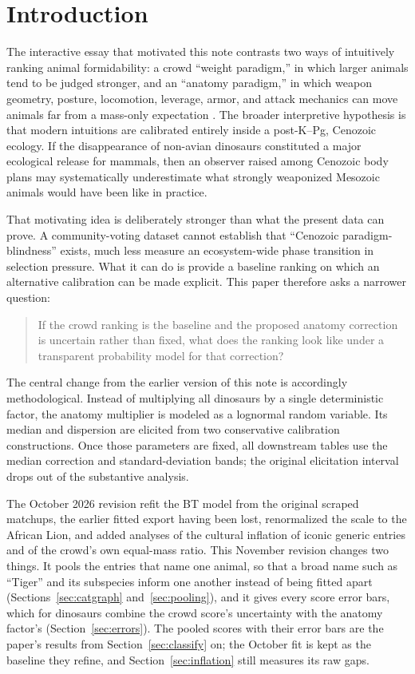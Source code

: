 \documentclass[11pt]{article}
\begin{document}
\tableofcontents
\newpage

\section{Introduction}

The interactive essay that motivated this note contrasts two ways of intuitively ranking animal formidability: a crowd ``weight paradigm,'' in which larger animals tend to be judged stronger, and an ``anatomy paradigm,'' in which weapon geometry, posture, locomotion, leverage, armor, and attack mechanics can move animals far from a mass-only expectation \cite{benanderDino2026}. The broader interpretive hypothesis is that modern intuitions are calibrated entirely inside a post-K--Pg, Cenozoic ecology. If the disappearance of non-avian dinosaurs constituted a major ecological release for mammals, then an observer raised among Cenozoic body plans may systematically underestimate what strongly weaponized Mesozoic animals would have been like in practice.

That motivating idea is deliberately stronger than what the present data can prove. A community-voting dataset cannot establish that ``Cenozoic paradigm-blindness'' exists, much less measure an ecosystem-wide phase transition in selection pressure. What it can do is provide a baseline ranking on which an alternative calibration can be made explicit. This paper therefore asks a narrower question:

\begin{quote}
If the crowd ranking is the baseline and the proposed anatomy correction is uncertain rather than fixed, what does the ranking look like under a transparent probability model for that correction?
\end{quote}

The central change from the earlier version of this note is accordingly methodological. Instead of multiplying all dinosaurs by a single deterministic factor, the anatomy multiplier is modeled as a lognormal random variable. Its median and dispersion are elicited from two conservative calibration constructions. Once those parameters are fixed, all downstream tables use the median correction and standard-deviation bands; the original elicitation interval drops out of the substantive analysis.

The October 2026 revision refit the BT model from the original scraped matchups, the earlier fitted export having been lost, renormalized the scale to the African Lion, and added analyses of the cultural inflation of iconic generic entries and of the crowd's own equal-mass ratio. This November revision changes two things. It pools the entries that name one animal, so that a broad name such as ``Tiger'' and its subspecies inform one another instead of being fitted apart (Sections~\ref{sec:catgraph} and~\ref{sec:pooling}), and it gives every score error bars, which for dinosaurs combine the crowd score's uncertainty with the anatomy factor's (Section~\ref{sec:errors}). The pooled scores with their error bars are the paper's results from Section~\ref{sec:classify} on; the October fit is kept as the baseline they refine, and Section~\ref{sec:inflation} still measures its raw gaps.
\end{document}
